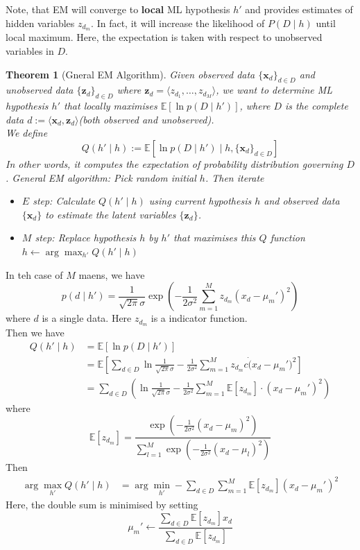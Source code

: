 \documentclass[12pt]{article}
\newtheorem{theorem}{Theorem}[section]
\theoremstyle{definition}
\begin{document}
Note, that EM will converge to \textbf{local} ML hypothesis $h'$ and provides estimates of hidden variables $z_{d_m}$. In fact, it will increase the likelihood of $P(D\mid h)$ until local maximum. Here, the expectation is taken with respect to unobserved variables in $D$. 
\begin{theorem}[Gneral EM Algorithm]
\normalfont Given observed data $\{\mathbf{x}_d\}_{d\in D}$ and unobserved data $\{\mathbf{z}_d\}_{d\in D}$ where $\mathbf{z}_d=\langle z_{d_1}, \ldots, z_{d_M}\rangle$, we want to determine ML hypothesis $h'$ that locally maximises $\mathbb{E}[\ln p(D\mid h')]$, where $D$ is the complete data $d:=\langle \mathbf{x}_d, \mathbf{z}_d\rangle$(both observed and unobserved).\\
We define 
\[
Q(h'\mid h):=\mathbb{E}[\ln p(D\mid h')\mid h, \{\mathbf{x}_d\}_{d\in D}]
\]
In other words, it computes the expectation of probability distribution governing $D$.
General EM algorithm: Pick random initial $h$. Then iterate
\begin{itemize}
	\item $E$ step: Calculate $Q(h' \mid h)$ using current hypothesis $h$ and observed data $\{\mathbf{x}_d\}$ to estimate the latent variables $\{\mathbf{z}_d\}$.
	\item $M$ step: Replace hypothesis $h$ by $h'$ that maximises this $Q$ function $h\leftarrow \arg\max_{h'} Q(h'\mid h)$
\end{itemize}
\end{theorem}
In teh case of $M$ maens, we have
\[
p(d\mid h') = \frac{1}{\sqrt{2\pi}\sigma}\exp(-\frac{1}{2\sigma^2}\sum_{m=1}^M z_{d_m}(x_d-\mu_m')^2)
\]
where $d$ is a single data. Here $z_{d_m}$ is a indicator function.\\
Then we have
\begin{align*}
Q(h'\mid h)&=\mathbb{E}[\ln p(D\mid h')]\\
&=\mathbb{E}[\sum_{d\in D} \ln \frac{1}{\sqrt{2\pi}\sigma}-\frac{1}{2\sigma^2}\sum_{m=1}^M z_{d_m}c\dot (x_d-\mu_m')^2]\\
&=\sum_{d\in D}(\ln \frac{1}{\sqrt{2\pi}\sigma} - \frac{1}{2\sigma^2}\sum_{m=1}^M \mathbb{E}[z_{d_m}]\cdot (x_d-\mu_m')^2)
\end{align*}
where 
\[\mathbb{E}[z_{d_m}]=\frac{\exp(-\frac{1}{2\sigma^2}(x_d-\mu_m)^2)}{\sum_{l=1}^M \exp(-\frac{1}{2\sigma^2}(x_d-\mu_l)^2)}\]
Then 
\begin{align*}
\arg\max_{h'} Q(h'\mid h)&=\arg\min_{h'}-\sum_{d\in D}\sum_{m=1}^M \mathbb{E}[z_{d_m}](x_d-\mu_m')^2
\end{align*}
Here, the double sum is minimised by setting
\[
\mu_m'\leftarrow \frac{\sum_{d\in D}\mathbb{E}[z_{d_m}]x_d}{\sum_{d\in D}\mathbb{E}[z_{d_m}]}
\]
\end{document}
